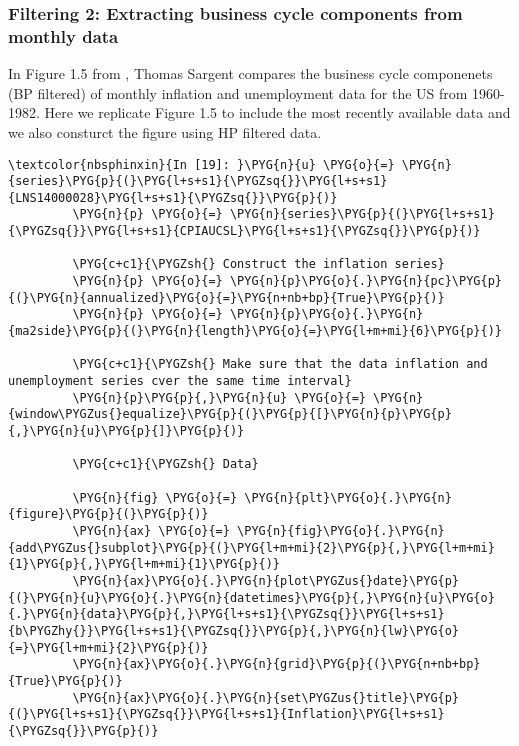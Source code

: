 \documentclass[letterpaper,10pt,openany,oneside,english]{sphinxmanual}
\begin{document}
\noindent{}


\subsubsection{Filtering 2: Extracting business cycle components from monthly data}
\label{\detokenize{fredpy_examples:Filtering-2:-Extracting-business-cycle-components-from-monthly-data}}
In Figure 1.5 from , Thomas Sargent
compares the business cycle componenets (BP filtered) of monthly
inflation and unemployment data for the US from 1960-1982. Here we
replicate Figure 1.5 to include the most recently available data and we
also consturct the figure using HP filtered data.

\begin{Verbatim}[commandchars=\\\{\}]
\textcolor{nbsphinxin}{In [19]: }\PYG{n}{u} \PYG{o}{=} \PYG{n}{series}\PYG{p}{(}\PYG{l+s+s1}{\PYGZsq{}}\PYG{l+s+s1}{LNS14000028}\PYG{l+s+s1}{\PYGZsq{}}\PYG{p}{)}
         \PYG{n}{p} \PYG{o}{=} \PYG{n}{series}\PYG{p}{(}\PYG{l+s+s1}{\PYGZsq{}}\PYG{l+s+s1}{CPIAUCSL}\PYG{l+s+s1}{\PYGZsq{}}\PYG{p}{)}
         
         \PYG{c+c1}{\PYGZsh{} Construct the inflation series}
         \PYG{n}{p} \PYG{o}{=} \PYG{n}{p}\PYG{o}{.}\PYG{n}{pc}\PYG{p}{(}\PYG{n}{annualized}\PYG{o}{=}\PYG{n+nb+bp}{True}\PYG{p}{)}
         \PYG{n}{p} \PYG{o}{=} \PYG{n}{p}\PYG{o}{.}\PYG{n}{ma2side}\PYG{p}{(}\PYG{n}{length}\PYG{o}{=}\PYG{l+m+mi}{6}\PYG{p}{)}
         
         \PYG{c+c1}{\PYGZsh{} Make sure that the data inflation and unemployment series cver the same time interval}
         \PYG{n}{p}\PYG{p}{,}\PYG{n}{u} \PYG{o}{=} \PYG{n}{window\PYGZus{}equalize}\PYG{p}{(}\PYG{p}{[}\PYG{n}{p}\PYG{p}{,}\PYG{n}{u}\PYG{p}{]}\PYG{p}{)}
         
         \PYG{c+c1}{\PYGZsh{} Data}
         
         \PYG{n}{fig} \PYG{o}{=} \PYG{n}{plt}\PYG{o}{.}\PYG{n}{figure}\PYG{p}{(}\PYG{p}{)}
         \PYG{n}{ax} \PYG{o}{=} \PYG{n}{fig}\PYG{o}{.}\PYG{n}{add\PYGZus{}subplot}\PYG{p}{(}\PYG{l+m+mi}{2}\PYG{p}{,}\PYG{l+m+mi}{1}\PYG{p}{,}\PYG{l+m+mi}{1}\PYG{p}{)}
         \PYG{n}{ax}\PYG{o}{.}\PYG{n}{plot\PYGZus{}date}\PYG{p}{(}\PYG{n}{u}\PYG{o}{.}\PYG{n}{datetimes}\PYG{p}{,}\PYG{n}{u}\PYG{o}{.}\PYG{n}{data}\PYG{p}{,}\PYG{l+s+s1}{\PYGZsq{}}\PYG{l+s+s1}{b\PYGZhy{}}\PYG{l+s+s1}{\PYGZsq{}}\PYG{p}{,}\PYG{n}{lw}\PYG{o}{=}\PYG{l+m+mi}{2}\PYG{p}{)}
         \PYG{n}{ax}\PYG{o}{.}\PYG{n}{grid}\PYG{p}{(}\PYG{n+nb+bp}{True}\PYG{p}{)}
         \PYG{n}{ax}\PYG{o}{.}\PYG{n}{set\PYGZus{}title}\PYG{p}{(}\PYG{l+s+s1}{\PYGZsq{}}\PYG{l+s+s1}{Inflation}\PYG{l+s+s1}{\PYGZsq{}}\PYG{p}{)}
         

\end{Verbatim}
\end{document}
